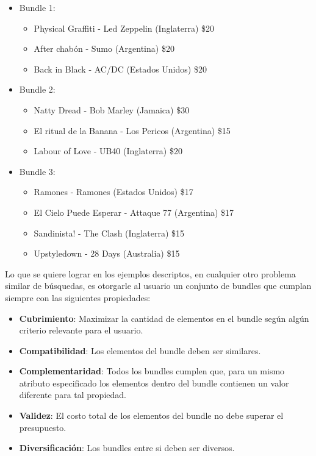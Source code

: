 \begin{itemize}
  \item Bundle 1:
  \begin{itemize}
    \item Physical Graffiti - Led Zeppelin (Inglaterra) \$20
    \item After chabón - Sumo (Argentina) \$20
    \item Back in Black - AC/DC (Estados Unidos) \$20
  \end{itemize}
  \item Bundle 2:
  \begin{itemize}
    \item Natty Dread - Bob Marley (Jamaica) \$30
    \item El ritual de la Banana - Los Pericos (Argentina) \$15
    \item Labour of Love - UB40 (Inglaterra) \$20
  \end{itemize}
	  \item Bundle 3:
  \begin{itemize}
    \item Ramones - Ramones (Estados Unidos) \$17
    \item El Cielo Puede Esperar - Attaque 77 (Argentina) \$17
    \item Sandinista! - The Clash (Inglaterra) \$15
	\item Upstyledown - 28 Days (Australia) \$15
  \end{itemize}
\end{itemize}
Lo que se quiere lograr en los ejemplos descriptos, en cualquier otro problema similar de búsquedas, es otorgarle al usuario un conjunto de bundles que cumplan siempre con las siguientes propiedades: 
\begin{itemize}
  \item \textbf{Cubrimiento}: Maximizar la cantidad de elementos en el bundle según algún criterio relevante para el usuario.
  \item \textbf{Compatibilidad}: Los elementos del bundle deben ser similares.
  \item \textbf{Complementaridad}: Todos los bundles cumplen que, para un mismo atributo especificado los elementos dentro del bundle contienen un valor diferente para tal propiedad.
  \item \textbf{Validez}: El costo total de los elementos del bundle no debe superar el presupuesto.
  \item \textbf{Diversificación}: Los bundles entre si deben ser diversos.
\end{itemize}
